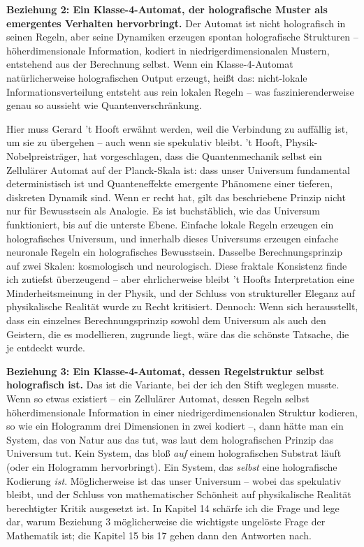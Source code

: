 \documentclass[11pt, twoside, openright]{book}
\begin{document}
\textbf{Beziehung 2: Ein Klasse-4-Automat, der holografische Muster als emergentes Verhalten hervorbringt.} Der Automat ist nicht holografisch in seinen Regeln, aber seine Dynamiken erzeugen spontan holografische Strukturen -- höherdimensionale Information, kodiert in niedrigerdimensionalen Mustern, entstehend aus der Berechnung selbst. Wenn ein Klasse-4-Automat natürlicherweise holografischen Output erzeugt, heißt das: nicht-lokale Informationsverteilung entsteht aus rein lokalen Regeln -- was faszinierenderweise genau so aussieht wie Quantenverschränkung.

Hier muss Gerard 't Hooft erwähnt werden, weil die Verbindung zu auffällig ist, um sie zu übergehen -- auch wenn sie spekulativ bleibt. 't Hooft, Physik-Nobelpreisträger, hat vorgeschlagen, dass die Quantenmechanik selbst ein Zellulärer Automat auf der Planck-Skala ist: dass unser Universum fundamental deterministisch ist und Quanteneffekte emergente Phänomene einer tieferen, diskreten Dynamik sind. Wenn er recht hat, gilt das beschriebene Prinzip nicht nur für Bewusstsein als Analogie. Es ist buchstäblich, wie das Universum funktioniert, bis auf die unterste Ebene. Einfache lokale Regeln erzeugen ein holografisches Universum, und innerhalb dieses Universums erzeugen einfache neuronale Regeln ein holografisches Bewusstsein. Dasselbe Berechnungsprinzip auf zwei Skalen: kosmologisch und neurologisch. Diese fraktale Konsistenz finde ich zutiefst überzeugend -- aber ehrlicherweise bleibt 't Hoofts Interpretation eine Minderheitsmeinung in der Physik, und der Schluss von struktureller Eleganz auf physikalische Realität wurde zu Recht kritisiert. Dennoch: Wenn sich herausstellt, dass ein einzelnes Berechnungsprinzip sowohl dem Universum als auch den Geistern, die es modellieren, zugrunde liegt, wäre das die schönste Tatsache, die je entdeckt wurde.

\textbf{Beziehung 3: Ein Klasse-4-Automat, dessen Regelstruktur selbst holografisch ist.} Das ist die Variante, bei der ich den Stift weglegen musste. Wenn so etwas existiert -- ein Zellulärer Automat, dessen Regeln selbst höherdimensionale Information in einer niedrigerdimensionalen Struktur kodieren, so wie ein Hologramm drei Dimensionen in zwei kodiert --, dann hätte man ein System, das von Natur aus das tut, was laut dem holografischen Prinzip das Universum tut. Kein System, das bloß \textit{auf} einem holografischen Substrat läuft (oder ein Hologramm hervorbringt). Ein System, das \textit{selbst} eine holografische Kodierung \textit{ist}. Möglicherweise ist das unser Universum -- wobei das spekulativ bleibt, und der Schluss von mathematischer Schönheit auf physikalische Realität berechtigter Kritik ausgesetzt ist. In Kapitel 14 schärfe ich die Frage und lege dar, warum Beziehung 3 möglicherweise die wichtigste ungelöste Frage der Mathematik ist; die Kapitel 15 bis 17 gehen dann den Antworten nach.
\end{document}
